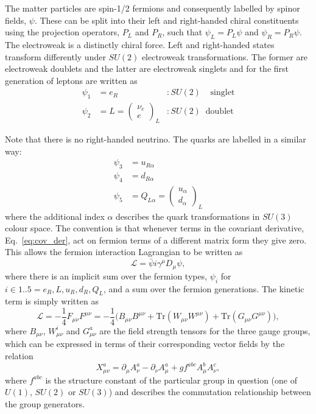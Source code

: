The matter particles are spin-1/2 fermions and consequently labelled by spinor fields, $\psi$. These can be split into their left and right-handed chiral constituents using the projection operators, $P_{L}$ and $P_{R}$, such that $\psi_{L}=P_{L}\psi$ and $\psi_{R}=P_{R}\psi$.
The electroweak is a distinctly chiral force. Left and right-handed states transform differently under $SU(2)$ electroweak transformations. The former are electroweak doublets and the latter are electroweak singlets and for the first generation of leptons are written as
\begin{align}
  \psi_{1} & = e_{R} &:SU(2)\;\;\;\;\mathrm{singlet} \\
  \psi_{2} & = L = \begin{pmatrix} \nu_{e} \\[-0.05cm] e \end{pmatrix}_{L} &:SU(2)\;\;\mathrm{doublet} 
\end{align}

Note that there is no right-handed neutrino. The quarks are labelled in a similar way:
\begin{align}
  \psi_{3} & = u_{R\alpha} \\
  \psi_{4} & = d_{R\alpha} \\
  \psi_{5} & = Q_{L\alpha} = \begin{pmatrix} u_{\alpha} \\[-0.05cm] d_{\alpha} \end{pmatrix}_{L}  
\end{align}
where the additional index $\alpha$ describes the quark transformations in $SU(3)$ colour space. The convention is that whenever terms in the covariant derivative, Eq.~\ref{eq:cov_der}, act on fermion terms of a different matrix form they give zero. This allows the \SM fermion interaction Lagrangian to be written as
\begin{equation}
  \mathcal{L} = \bar{\psi}i\gamma^{\mu}D_{\mu}\psi,
\end{equation}
where there is an implicit sum over the fermion types, $\psi_{i}$ for $i\in{1..5}=e_{R}, L, u_{R}, d_{R}, Q_{L}$, and a sum over the fermion generations. The kinetic term is simply written as
\begin{equation}
  \mathcal{L} = -\frac{1}{4}F_{\mu\nu}F^{\mu\nu} = -\frac{1}{4}\biggl( B_{\mu\nu}B^{\mu\nu} + \mathrm{Tr} (W_{\mu\nu}W^{\mu\nu}) + \mathrm{Tr} (G_{\mu\nu}G^{\mu\nu}) \biggr),
\end{equation}
where $B_{\mu\nu}$, $W_{\mu\nu}^{i}$ and $G_{\mu\nu}^{a}$ are the field strength tensors for the three \SM gauge groups, which can be expressed in terms of their corresponding vector fields by the relation
\begin{equation}
X^{a}_{\mu\nu} = \partial_{\mu}A^{a}_{\nu}-\partial_{\nu}A^{a}_{\mu}+gf^{abc}A^{b}_{\mu}A^{c}_{\nu},
\end{equation}
where $f^{abc}$ is the structure constant of the particular group in question (one of $U(1)$, $SU(2)$ or $SU(3)$) and describes the commutation relationship between the group generators. %


